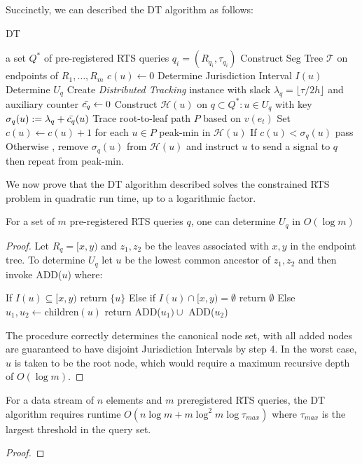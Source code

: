 Succinctly, we can described the DT algorithm as follows: 
\begin{algorithm}
\caption{DT }\label{Algorithm 2}
\begin{algorithmic}
\Require a set $Q^*$ of pre-registered RTS queries $q_i = (R_{q_i}, \tau_{q_i})$
\State Construct Seg Tree $\mathcal{T}$ on endpoints of $R_1, \dots, R_m$
    \State $c(u)\gets 0$
    \State Determine Jurisdiction Interval $I(u)$
\EndFor
{}
    \State Determine $U_q$
    \State Create \textit{Distributed Tracking} instance with slack $\lambda_q = \lfloor \tau/2h\rfloor$ and auxiliary counter $\Bar{c_q}\gets0$
\EndFor
{}
    \State Construct $\mathcal{H}(u)$ on $q\subset Q^* : u\in U_q$ with key $\sigma_q(u) := \lambda_q + \Bar{c_q}(u)$
\EndFor
{}
    \State Trace root-to-leaf path $P$ based on $v(e_t)$
    \State Set $c(u) \gets c(u)+1$ for each $u\in P$
        \State peak-min in $\mathcal{H}(u)$
        \State If $c(u) < \sigma_q(u)$ pass
        \State Otherwise , remove $\sigma_q(u)$ from $\mathcal{H}(u)$ and instruct $u$ to send a signal to $q$ then repeat from peak-min.
    \EndFor
\EndFor
\end{algorithmic}
\end{algorithm}
We now prove that the DT algorithm described solves the constrained RTS problem in quadratic run time, up to a logarithmic factor.

\begin{lemma}
    For a set of $m$ pre-registered RTS queries $q$, one can determine $U_q$ in $O(\log m)$ 
\end{lemma}
\begin{proof}
    Let $R_q = [x,y)$ and $z_1, z_2$ be the leaves associated with $x, y$ in the endpoint tree. To determine $U_{q}$ let $u$ be the lowest common ancestor of $z_1, z_2$ and then invoke ADD($u$) where:
    \begin{algorithmic}[1]
        \State If $I(u)\subseteq[x,y)$ return $\{u\}$
        \State Else if $I(u)\cap[x,y) = \emptyset$ return $\emptyset$
        \State Else $u_1, u_2 \gets \text{children}(u)$ return ADD($u_1) \cup $ ADD($u_2$)
    \EndProcedure
    \end{algorithmic}
    The procedure correctly determines the canonical node set, with all added nodes are guaranteed to have disjoint Jurisdiction Intervals by step 4. In the worst case, $u$ is taken to be the root node, which would require a maximum recursive depth of $O(\log m)$. 
\end{proof}

\begin{theorem} For a data stream of $n$ elements and $m$ preregistered RTS queries, the DT algorithm requires runtime $O(n\log m + m\log^2m\log \tau_{max})$ where $\tau_{max}$ is the largest threshold in the query set. 
\end{theorem}
\begin{proof}
    
\end{proof}
